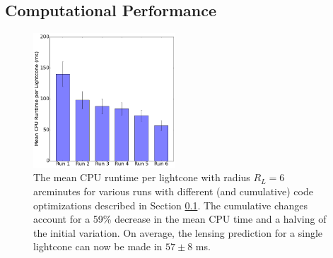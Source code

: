 \documentclass[%
 reprint,
 amsmath,amssymb,
 aps,nofootinbib
]{revtex4-1}
\begin{document}
\subsection{Computational Performance} \label{comp_perform}

\begin{figure}
    \centering
    \includegraphics[width=0.475\textwidth]{figs-swe/thesis/profile_bar.png}
    \captionsetup{justification=raggedright,singlelinecheck=false}
    \caption{The mean CPU runtime per lightcone with radius $R_L=6$ arcminutes for various runs with different (and cumulative) code optimizations described in Section \ref{comp_perform}. The cumulative changes account for a 59\% decrease in the mean CPU time and a halving of the initial variation. On average, the lensing prediction for a single lightcone can now be made in $57\pm8$ ms.}
    \label{fig:cpu_plot}
\end{figure}
\end{document}
